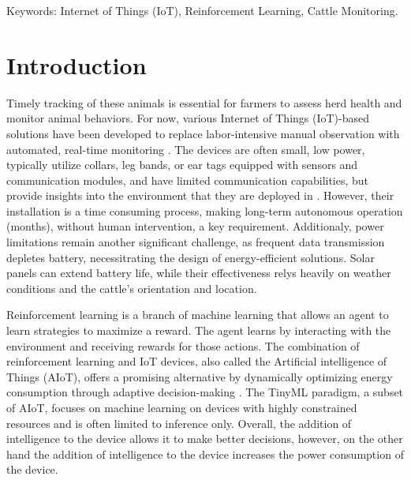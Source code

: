 \documentclass[10pt]{cai}
\begin{document}
\begin{keywords}{Keywords:}
Internet of Things (IoT), Reinforcement Learning, Cattle Monitoring.
\end{keywords}
\copyrightnotice

\section{Introduction}

Timely tracking of these animals is essential for farmers to assess herd health and monitor animal behaviors. 
For now, various Internet of Things (IoT)-based solutions have been developed to replace labor-intensive manual observation with automated, real-time monitoring \cite{unoldIoTBasedCowHealth2020}.
The devices are often small, low power, typically utilize collars, leg bands, or ear tags equipped with sensors and communication modules, and have limited communication capabilities, but provide insights into the environment that they are deployed in \cite{unoldIoTBasedCowHealth2020} \cite{moutaouakilDigitalFarmingSurvey2023}.
However, their installation is a time consuming process, making long-term autonomous operation (months), without human intervention, a key requirement.
Additionaly, power limitations remain another significant challenge, as frequent data transmission depletes battery, necessitrating the design of energy-efficient solutions.
Solar panels can extend battery life, while their effectiveness relys heavily on weather conditions and the cattle's orientation and location.

Reinforcement learning is a branch of machine learning that allows an agent to learn strategies to maximize a reward.
The agent learns by interacting with the environment and receiving rewards for those actions.
The combination of reinforcement learning and IoT devices, also called the Artificial intelligence of Things (AIoT)\cite{yamsaniIoTBasedLivestockMonitoring2024}, offers a promising alternative by dynamically optimizing energy consumption through adaptive decision-making \cite{suttonReinforcementLearningIntroduction2020}. 
The TinyML paradigm, a subset of AIoT, focuses on machine learning on devices with highly constrained resources and is often limited to inference only\cite{rayReviewTinyMLStateoftheart2022}.
Overall, the addition of intelligence to the device allows it to make better decisions, however, on the other hand the addition of intelligence to the device increases the power consumption of the device.
\end{document}

